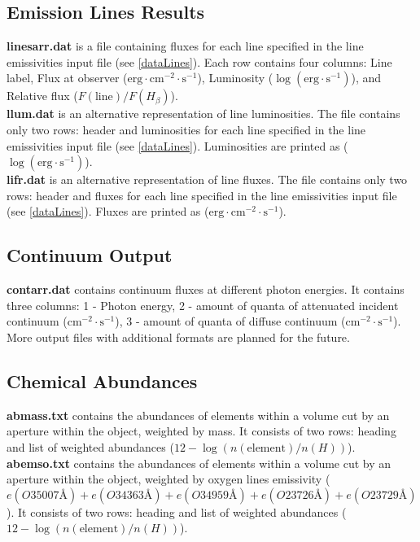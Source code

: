 \documentclass[a4paper]{article}
\begin{document}
\subsection{Emission Lines Results}
{\bf linesarr.dat} is a file containing fluxes for each line specified in the line emissivities input file (see \ref{dataLines}).
Each row contains four columns: Line label, Flux at observer ($\mathrm{erg} \cdot \mathrm{cm}^{-2} \cdot \mathrm{s}^{-1}$),
Luminosity ($\log(\mathrm{erg} \cdot \mathrm{s}^{-1})$),
and Relative flux ($F(\text{line})/F(H_{\beta})$).\\
{\bf llum.dat} is an alternative representation of line luminosities. The file contains only two rows: header and luminosities
for each line specified in the line emissivities input file (see \ref{dataLines}).
Luminosities are printed as ($\log(\mathrm{erg} \cdot \mathrm{s}^{-1})$). \\
{\bf lifr.dat} is an alternative representation of line fluxes. The file contains only two rows: header and fluxes for each line
specified in the line emissivities input file (see \ref{dataLines}).
Fluxes are printed as ($\mathrm{erg} \cdot \mathrm{cm}^{-2} \cdot \mathrm{s}^{-1}$).

\subsection{Continuum Output}
{\bf contarr.dat} contains continuum fluxes at different photon energies. It contains three columns:
1 - Photon energy, 2 - amount of quanta of attenuated incident continuum ($\mathrm{cm}^{-2} \cdot \mathrm{s}^{-1}$), 3 - amount of quanta of diffuse continuum ($\mathrm{cm}^{-2} \cdot \mathrm{s}^{-1}$).\\

More output files with additional formats are planned for the future.

\subsection{Chemical Abundances}
{\bf abmass.txt} contains the abundances of elements within a volume cut by an aperture within the object, weighted by mass.
It consists of two rows: heading and list of weighted abundances ($12 - \log(n(\text{element})/n(H))$). \\
{\bf abemso.txt} contains the abundances of elements within a volume cut by an aperture within the object, weighted by oxygen
lines emissivity ($e(O3  5007\text{\AA}) + e(O3  4363\text{\AA}) + e(O3  4959\text{\AA}) + e(O2  3726\text{\AA}) + e(O2  3729\text{\AA})$).
It consists of two rows: heading and list of weighted abundances ($12 - \log(n(\text{element})/n(H))$).
\end{document}
